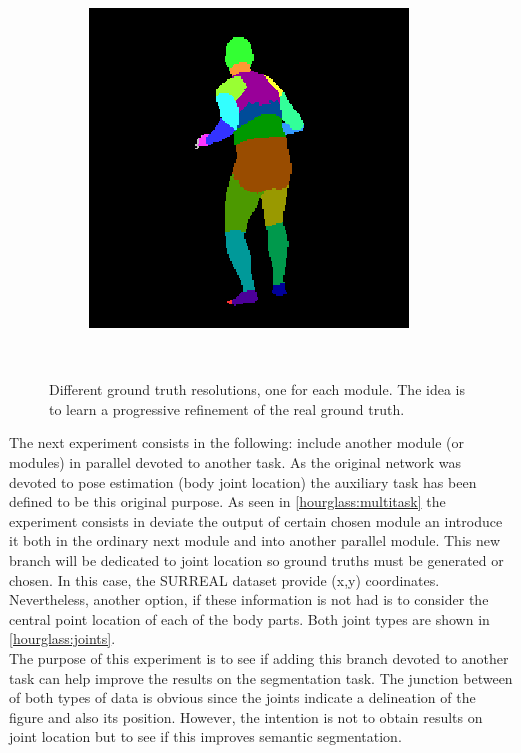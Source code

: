 \documentclass[12pt,a4paper]{article}
\begin{document}
\begin{figure}
\begin{subfigure}{.19\textwidth}
\end{subfigure}
\begin{subfigure}{.19\textwidth}
  \centering
  \includegraphics[scale=0.3]{02_05_c0005_segm_80_25c.png}\\
\end{subfigure}\\
\caption{Different ground truth resolutions, one for each module. The idea is to learn a progressive refinement of the real ground truth.}
\label{hourglass:diffgrounds}
\end{figure}

The next experiment consists in the following: include another module (or modules) in parallel devoted to another task. As the original network was devoted to pose estimation (body joint location) the auxiliary task has been defined to be this original purpose. As seen in \ref{hourglass:multitask} the experiment consists in deviate the output of certain chosen module an introduce it both in the ordinary next module and into another parallel module. This new branch will be dedicated to joint location so ground truths must be generated or chosen. In this case, the SURREAL dataset provide (x,y) coordinates. Nevertheless, another option, if these information is not had is to consider the central point location of each of the body parts. Both joint types are shown in \ref{hourglass:joints}.\\

The purpose of this experiment is to see if adding this branch devoted to another task can help improve the results on the segmentation task. The junction between of both types of data is obvious since the joints indicate a delineation of the figure and also its position. However, the intention is not to obtain results on joint location but to see if this improves semantic segmentation.\\
\end{document}
